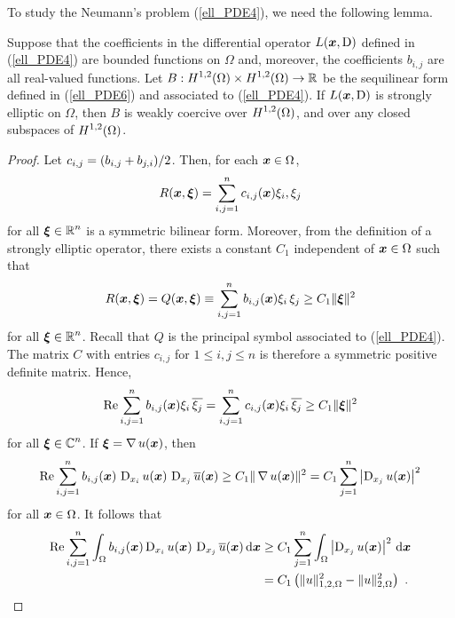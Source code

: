To study the Neumann's problem (\ref{ell_PDE4}), we need the following lemma.

\begin{lemma} \label{ell_stell_coerc}
Suppose that the coefficients in the differential operator
$L({\bm{x}},\operatorname{D})$ defined in (\ref{ell_PDE4}) are bounded functions on
$\Omega$ and, moreover, the coefficients $b_{i,j}$ are all real-valued
functions.  Let
$\displaystyle B:H^{1,2}(\Omega)\times H^{1,2}(\Omega) \rightarrow \mathbb{R}$
be the sequilinear form defined in (\ref{ell_PDE6}) and associated to
(\ref{ell_PDE4}).  If $L({\bm{x}},\operatorname{D})$ is strongly elliptic on $\Omega$,
then $B$ is weakly coercive over $\displaystyle H^{1,2}(\Omega)$, and
over any closed subspaces of $\displaystyle H^{1,2}(\Omega)$.
\end{lemma}

\begin{proof}
Let $\displaystyle c_{i,j} = (b_{i,j}+ b_{j,i})/2$.  Then, for
each ${\bm{x}} \in \Omega$,
\[
R({\bm{x}},{\bm{\xi}}) = \sum_{i,j=1}^n c_{i,j}({\bm{x}}) \xi_i,\xi_j
\]
for all $\displaystyle {\bm{\xi}} \in \mathbb{R}^n$
is a symmetric bilinear form.  Moreover, from the definition
of a strongly elliptic operator, there exists a constant
$C_1$ independent of ${\bm{x}} \in \Omega$ such that
\[
R({\bm{x}}, {\bm{\xi}}) = Q({\bm{x}}, {\bm{\xi}})
\equiv \sum_{i,j=1}^n b_{i,j}({\bm{x}}) \xi_i\,\xi_j \geq C_1 \|{\bm{\xi}}\|^2
\]
for all $\displaystyle {\bm{\xi}} \in \mathbb{R}^n$.
Recall that $Q$ is the principal symbol associated to (\ref{ell_PDE4}).
The matrix $C$ with entries $c_{i,j}$ for $1\leq i,j \leq n$ is
therefore a symmetric positive definite \nn matrix.  Hence,
\begin{equation} \label{ell_stell_coerc_eq}
\operatorname{Re} \sum_{i,j=1}^n b_{i,j}({\bm{x}}) \xi_i\,\overline{\xi_j} =
\sum_{i,j=1}^n c_{i,j}({\bm{x}}) \xi_i\,\overline{\xi_j} \geq C_1
\|{\bm{\xi}}\|^2
\end{equation}
for all $\displaystyle {\bm{\xi}} \in \mathbb{C}^n$.
If ${\bm{\xi}} = \operatorname{\nabla} u({\bm{x}})$, then
\[
\operatorname{Re} \sum_{i,j=1}^n b_{i,j}({\bm{x}})\, \operatorname{D}_{x_i}u({\bm{x}})
 \,\operatorname{D}_{x_j}\overline{u}({\bm{x}}) \geq C_1 \|\operatorname{\nabla} u({\bm{x}})\|^2
= C_1 \sum_{j=1}^n \left| \operatorname{D}_{x_j} u({\bm{x}}) \right|^2
\]
for all ${\bm{x}} \in \Omega$.  It follows that
\begin{align}
\operatorname{Re} \sum_{i,j=1}^n \int_\Omega b_{i,j}({\bm{x}}) \operatorname{D}_{x_i}u({\bm{x}})
\,\operatorname{D}_{x_j}\overline{u}({\bm{x}}) \,\mathrm{d}{{\bm{x}}}
&\geq C_1 \sum_{j=1}^n \int_\Omega
\left|\operatorname{D}_{x_j} u({\bm{x}})\right|^2 \,\mathrm{d}{{\bm{x}}} \nonumber \\
&= C_1 \left( \|u\|_{1,2,\Omega}^2 - \|u\|_{2,\Omega}^2 \right) \ .
\label{ell_NlemEq1} 
\end{align}

\end{proof}

